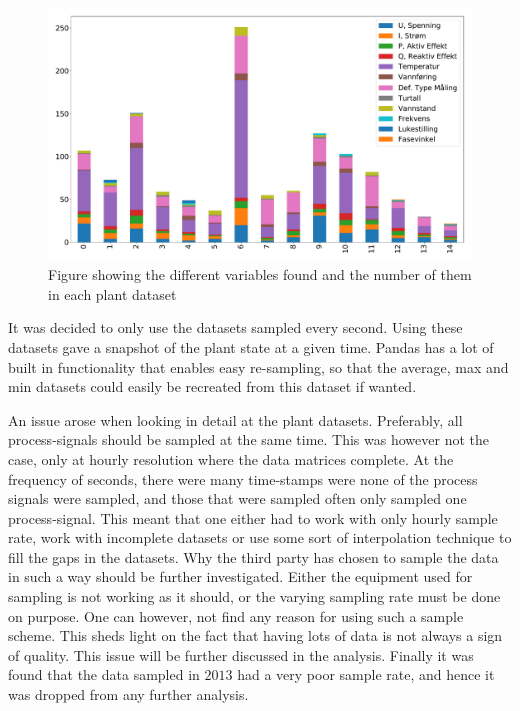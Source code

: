         \begin{figure}
            \centering
            \includegraphics[width=\textwidth]{report/figures/data/plant_signal_types_overview.pdf}
            \caption{Figure showing the different variables found and the number of them in each plant dataset}
            \label{fig:signal_type_overview}
        \end{figure}
        
        It was decided to only use the datasets sampled every second. Using these datasets gave a snapshot of the plant state at a given time. Pandas has a lot of built in functionality that enables easy re-sampling, so that the average, max and min datasets could easily be recreated from this dataset if wanted.
        
        An issue arose when looking in detail at the plant datasets. Preferably, all process-signals should be sampled at the same time. This was however not the case, only at hourly resolution where the data matrices complete. At the frequency of seconds, there were many time-stamps were none of the process signals were sampled, and those that were sampled often only sampled one process-signal. This meant that one either had to work with only hourly sample rate, work with incomplete datasets or use some sort of interpolation technique to fill the gaps in the datasets. Why the third party has chosen to sample the data in such a way should be further investigated. Either the equipment used for sampling is not working as it should, or the varying sampling rate must be done on purpose. One can however, not find any reason for using such a sample scheme. This sheds light on the fact that having lots of data is not always a sign of quality. This issue will be further discussed in the analysis. Finally it was found that the data sampled in $2013$ had a very poor sample rate, and hence it was dropped from any further analysis. 
        
